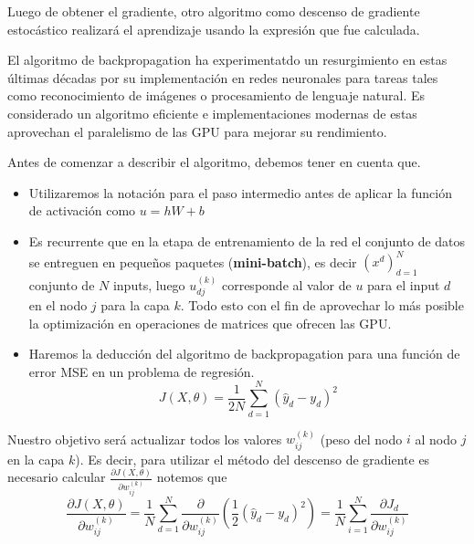 Luego de obtener el gradiente, otro algoritmo como descenso de gradiente estocástico realizará el aprendizaje usando la expresión que fue calculada. 

El algoritmo de backpropagation ha experimentatdo un resurgimiento en estas últimas décadas por su implementación en redes neuronales para tareas tales como reconocimiento de imágenes o procesamiento de lenguaje natural. 
Es considerado un algoritmo eficiente e implementaciones modernas de estas aprovechan el paralelismo de las GPU para mejorar su rendimiento. 

Antes de comenzar a describir el algoritmo, debemos tener en cuenta que.   
\begin{itemize}

	\item Utilizaremos la notación para el paso intermedio antes de aplicar la función de activación como $u = hW + b$
  
	\item Es recurrente que en la etapa de entrenamiento de la red el conjunto de datos se entreguen en pequeños paquetes (\textbf{mini-batch}), es decir $(x^d)_{d=1}^N$  conjunto de $N$ inputs, luego $u_{dj}^{(k)}$ corresponde al valor de $u$ para el input $d$ en el nodo $j$ para la capa $k$. Todo esto con el fin de aprovechar lo más posible la optimización en operaciones de matrices que ofrecen las GPU.

   
   \item Haremos la deducción del algoritmo de backpropagation para una función de error MSE en un problema de regresión.
   \[
	J(X ,\theta) = \frac{1}{2N}\sum_{d=1}^N(\hat{y}_d-y_d)^2
	\]	
  
\end{itemize} 

Nuestro objetivo será actualizar todos los valores $w_{ij}^{(k)}$ (peso del nodo $i$ al nodo $j$ en la capa $k$). Es decir, para utilizar el método del descenso de gradiente es necesario calcular $\frac{\partial J(X , \theta) }{\partial w_{ij}^{(k)}}$ notemos que 
\[
\frac{\partial J(X , \theta) }{\partial w_{ij}^{(k)}} = \frac{1}{N}\sum_{d=1}^N \frac{\partial}{\partial w_{ij}^{(k)}} \left ( \frac{1}{2}(\hat{y}_d-y_d)^2 \right) = \frac{1}{N}\sum_{i=1}^N \frac{\partial J_d}{\partial w_{ij}^{(k)}}
\]

